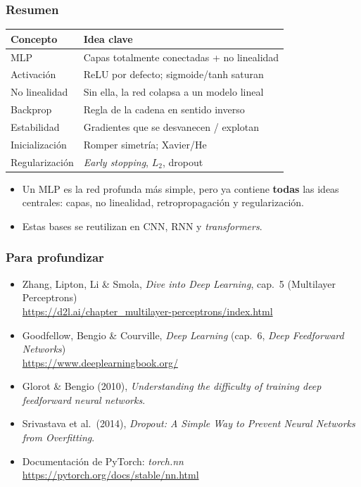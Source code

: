\documentclass[aspectratio=169, 10pt]{beamer}
\begin{document}
\begin{frame}
\frametitle{Resumen}
\begin{center}
\begin{tabular}{ll}
\toprule
\textbf{Concepto} & \textbf{Idea clave}\\
\midrule
MLP             & Capas totalmente conectadas + no linealidad\\
Activaci\'on    & ReLU por defecto; sigmoide/tanh saturan\\
No linealidad   & Sin ella, la red colapsa a un modelo lineal\\
Backprop        & Regla de la cadena en sentido inverso\\
Estabilidad     & Gradientes que se desvanecen / explotan\\
Inicializaci\'on& Romper simetr\'ia; Xavier/He\\
Regularizaci\'on& \emph{Early stopping}, $L_2$, dropout\\
\bottomrule
\end{tabular}
\end{center}
\vspace{0.8em}
\begin{itemize}
	\item Un MLP es la red profunda m\'as simple, pero ya contiene \textbf{todas} las ideas centrales: capas, no linealidad, retropropagaci\'on y regularizaci\'on.
	\item Estas bases se reutilizan en CNN, RNN y \emph{transformers}.
\end{itemize}
\end{frame}

\begin{frame}
\frametitle{Para profundizar}
\begin{itemize}
	\item Zhang, Lipton, Li \& Smola, \emph{Dive into Deep Learning}, cap.~5 (Multilayer Perceptrons)\\ \url{https://d2l.ai/chapter_multilayer-perceptrons/index.html}
	\item Goodfellow, Bengio \& Courville, \emph{Deep Learning} (cap.~6, \emph{Deep Feedforward Networks})\\ \url{https://www.deeplearningbook.org/}
	\item Glorot \& Bengio (2010), \emph{Understanding the difficulty of training deep feedforward neural networks}.
	\item Srivastava et al.\ (2014), \emph{Dropout: A Simple Way to Prevent Neural Networks from Overfitting}.
	\item Documentaci\'on de PyTorch: \emph{torch.nn}\\ \url{https://pytorch.org/docs/stable/nn.html}
\end{itemize}
\end{frame}
\end{document}
